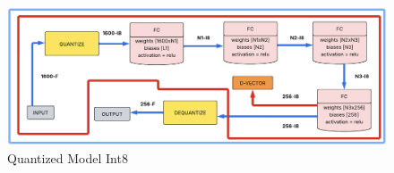 \begin{center}
\begin{figure}[!h]
        \centering
        \includegraphics[width=1.0\textwidth]{images/3.05 Quantized Model Int8.png}
        \caption{Quantized Model Int8}
    \end{figure}
\end{center}
\newpage
